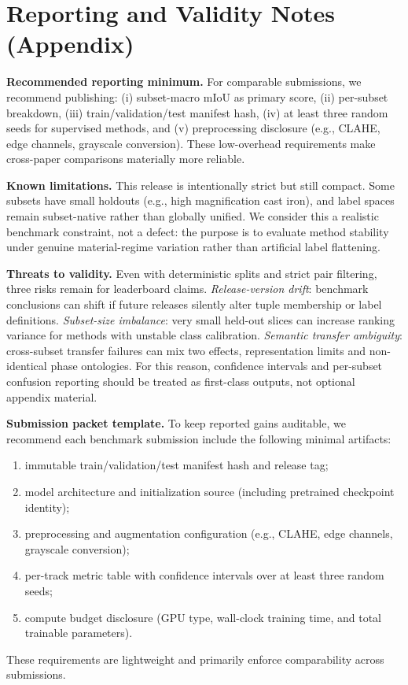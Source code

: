 \documentclass{article}
\begin{document}
\section{Reporting and Validity Notes (Appendix)}
\textbf{Recommended reporting minimum.} For comparable submissions, we recommend publishing: (i) subset-macro mIoU as primary score, (ii) per-subset breakdown, (iii) train/validation/test manifest hash, (iv) at least three random seeds for supervised methods, and (v) preprocessing disclosure (e.g., CLAHE, edge channels, grayscale conversion). These low-overhead requirements make cross-paper comparisons materially more reliable.

\textbf{Known limitations.} This release is intentionally strict but still compact. Some subsets have small holdouts (e.g., high magnification cast iron), and label spaces remain subset-native rather than globally unified. We consider this a realistic benchmark constraint, not a defect: the purpose is to evaluate method stability under genuine material-regime variation rather than artificial label flattening.

\textbf{Threats to validity.} Even with deterministic splits and strict pair filtering, three risks remain for leaderboard claims. \emph{Release-version drift}: benchmark conclusions can shift if future releases silently alter tuple membership or label definitions. \emph{Subset-size imbalance}: very small held-out slices can increase ranking variance for methods with unstable class calibration. \emph{Semantic transfer ambiguity}: cross-subset transfer failures can mix two effects, representation limits and non-identical phase ontologies. For this reason, confidence intervals and per-subset confusion reporting should be treated as first-class outputs, not optional appendix material.

\textbf{Submission packet template.} To keep reported gains auditable, we recommend each benchmark submission include the following minimal artifacts:
\begin{enumerate}[leftmargin=*,nosep]
    \item immutable train/validation/test manifest hash and release tag;
    \item model architecture and initialization source (including pretrained checkpoint identity);
    \item preprocessing and augmentation configuration (e.g., CLAHE, edge channels, grayscale conversion);
    \item per-track metric table with confidence intervals over at least three random seeds;
    \item compute budget disclosure (GPU type, wall-clock training time, and total trainable parameters).
\end{enumerate}
These requirements are lightweight and primarily enforce comparability across submissions.
\end{document}
